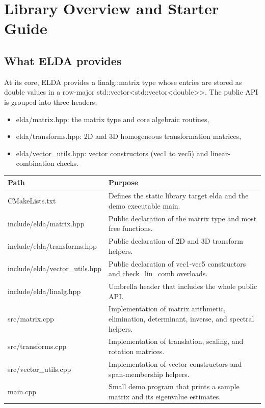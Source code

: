 \documentclass[11pt,a4paper,openany]{book}
\def\code#1{#1}%
\def\ELDA{ELDA}%
\newcommand{\ELDA}{\textsc{ELDA}}
\DeclareRobustCommand{\code}[1]{\texttt{\detokenize{#1}}}
\begin{document}
\tableofcontents

\mainmatter

\chapter{Library Overview and Starter Guide}

\section{What ELDA provides}
At its core, \ELDA{} provides a \code{linalg::matrix} type whose entries are stored as \code{double} values in a row-major \code{std::vector<std::vector<double>>}. The public API is grouped into three headers:
\begin{itemize}
    \item \code{elda/matrix.hpp}: the matrix type and core algebraic routines,
    \item \code{elda/transforms.hpp}: 2D and 3D homogeneous transformation matrices,
    \item \code{elda/vector_utils.hpp}: vector constructors (\code{vec1} to \code{vec5}) and linear-combination checks.
\end{itemize}

\begin{techbox}
\begin{tabularx}{\linewidth}{@{}lX@{}}
\toprule
Path & Purpose \\
\midrule
\code{CMakeLists.txt} & Defines the static library target \code{elda} and the demo executable \code{main}. \\
\code{include/elda/matrix.hpp} & Public declaration of the matrix type and most free functions. \\
\code{include/elda/transforms.hpp} & Public declaration of 2D and 3D transform helpers. \\
\code{include/elda/vector_utils.hpp} & Public declaration of \code{vec1}-\code{vec5} constructors and \code{check_lin_comb} overloads. \\
\code{include/elda/linalg.hpp} & Umbrella header that includes the whole public API. \\
\code{src/matrix.cpp} & Implementation of matrix arithmetic, elimination, determinant, inverse, and spectral helpers. \\
\code{src/transforms.cpp} & Implementation of translation, scaling, and rotation matrices. \\
\code{src/vector_utils.cpp} & Implementation of vector constructors and span-membership helpers. \\
\code{main.cpp} & Small demo program that prints a sample matrix and its eigenvalue estimates. \\
\bottomrule
\end{tabularx}
\end{techbox}
\end{document}
